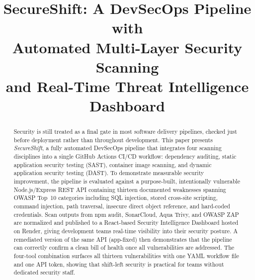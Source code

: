 \documentclass[10pt,conference]{IEEEtran}
\begin{document}
\title{SecureShift: A DevSecOps Pipeline with\\
Automated Multi-Layer Security Scanning\\
and Real-Time Threat Intelligence Dashboard}

\author{
  \and
  \and
}

\maketitle

\begin{abstract}
Security is still treated as a final gate in most software delivery pipelines,
checked just before deployment rather than throughout development.
This paper presents \emph{SecureShift}, a fully automated DevSecOps pipeline
that integrates four scanning disciplines into a single GitHub Actions
CI/CD workflow: dependency auditing, static application security testing
(SAST), container image scanning, and dynamic application security testing
(DAST).
To demonstrate measurable security improvement, the pipeline is evaluated
against a purpose-built, intentionally vulnerable Node.js/Express REST API
containing thirteen documented weaknesses spanning OWASP Top~10 categories
including SQL injection, stored cross-site scripting, command injection, path
traversal, insecure direct object reference, and hard-coded credentials.
Scan outputs from npm audit, SonarCloud, Aqua Trivy, and OWASP ZAP are
normalized and published to a React-based Security Intelligence Dashboard
hosted on Render, giving development teams real-time visibility into
their security posture.
A remediated version of the same API (app-fixed) then demonstrates that the
pipeline can correctly confirm a clean bill of health once all vulnerabilities
are addressed.
The four-tool combination surfaces all thirteen vulnerabilities with one
YAML workflow file and one API token, showing that shift-left security
is practical for teams without dedicated security staff.
\end{abstract}
\end{document}
